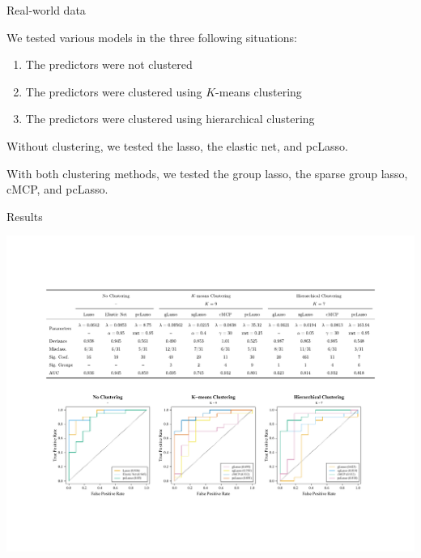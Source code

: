 \documentclass[8pt]{beamer}
\newcommand{\mys}{\vspace{0.5cm} \pause
}
\begin{document}
\begin{frame}{\color{white} Real-world data}


We tested various models in the three following situations:
\begin{enumerate}
    \item The predictors were not clustered
    \item The predictors were clustered using $K$-means clustering
    \item The predictors were clustered using hierarchical clustering
\end{enumerate} \mys

Without clustering, we tested the lasso, the elastic net, and pcLasso. \mys

With both clustering methods, we tested the group lasso, the sparse group lasso, cMCP, and pcLasso. \mys

    
\end{frame}

\begin{frame}{Results}

\begin{center}
    \includegraphics[trim = 75 100 75 100, clip, width = \textwidth]{colon_tab.pdf}
\end{center}
    
\end{frame}
\end{document}

